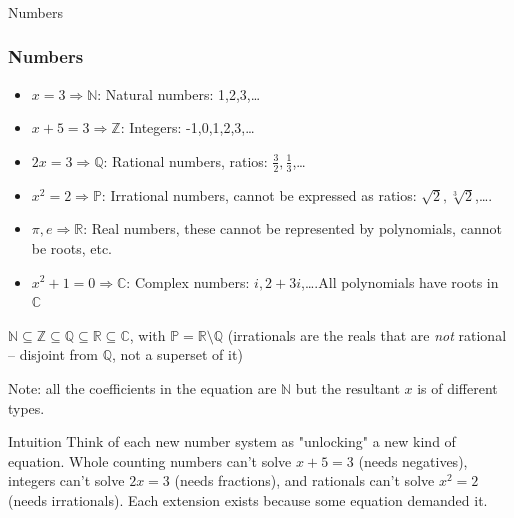 \begin{frame}[fragile]\frametitle{}
\begin{center}
{\Large Numbers}
\end{center}
\end{frame}

 \begin{frame}[fragile]\frametitle{Numbers}
\begin{itemize}
\item $ x = 3 \Rightarrow \mathbb{N}$: Natural numbers: 1,2,3,\ldots
\item $ x + 5 = 3 \Rightarrow \mathbb{Z}$: Integers: -1,0,1,2,3,\ldots
\item $ 2x = 3 \Rightarrow \mathbb{Q}$: Rational numbers, ratios: $\frac{3}{2},\frac{1}{3}$,\ldots
\item $ x^2 = 2 \Rightarrow \mathbb{P}$: Irrational numbers, cannot be expressed as ratios: $\sqrt{2},\sqrt[3]{2}$,\ldots.
\item $\pi, e \Rightarrow \mathbb{R}$: Real numbers, these cannot be represented by polynomials, cannot be roots, etc.
\item $ x^2 +1 = 0 \Rightarrow \mathbb{C}$: Complex numbers: $i,2+3i$,\ldots.All polynomials have roots in $\mathbb{C}$
\end{itemize}

$\mathbb{N} \subseteq \mathbb{Z} \subseteq \mathbb{Q} \subseteq \mathbb{R} \subseteq \mathbb{C} $, with $\mathbb{P} = \mathbb{R} \setminus \mathbb{Q}$ (irrationals are the reals that are \emph{not} rational -- disjoint from $\mathbb{Q}$, not a superset of it)

Note: all the coefficients in the equation are $\mathbb{N}$ but the resultant $x$ is of different types.

\begin{block}{Intuition}
Think of each new number system as "unlocking" a new kind of equation. Whole counting numbers can't solve $x+5=3$ (needs negatives), integers can't solve $2x=3$ (needs fractions), and rationals can't solve $x^2=2$ (needs irrationals). Each extension exists because some equation demanded it.
\end{block}
\end{frame}

